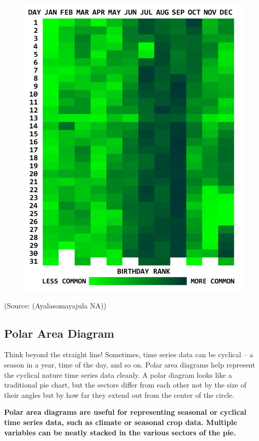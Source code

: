\documentclass[]{book}
\begin{document}
\begin{figure}
\centering
\includegraphics{images/aya-heat-map.png}
\caption{}
\end{figure}

(Source: (Ayalasomayajula NA))

\subsection{Polar Area Diagram}\label{polar-area-diagram}

Think beyond the straight line! Sometimes, time series data can be
cyclical -- a season in a year, time of the day, and so on. Polar area
diagrams help represent the cyclical nature time series data cleanly. A
polar diagram looks like a traditional pie chart, but the sectors differ
from each other not by the size of their angles but by how far they
extend out from the center of the circle.

\textbf{Polar area diagrams are useful for representing seasonal or
cyclical time series data, such as climate or seasonal crop data.
Multiple variables can be neatly stacked in the various sectors of the
pie.}
\end{document}
